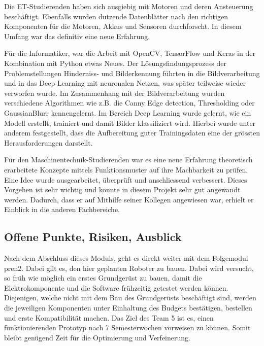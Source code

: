 Die ET-Studierenden haben sich ausgiebig mit Motoren und deren Ansteuerung beschäftigt. Ebenfalls wurden dutzende Datenblätter nach den richtigen Komponenten für die Motoren, Akkus und Sensoren durchforscht. In diesem Umfang war das definitiv eine neue Erfahrung.

Für die Informatiker, war die Arbeit mit OpenCV, TensorFlow und Keras in der Kombination mit Python etwas Neues. Der Lösungsfindungsprozess der Problemstellungen Hinderniss- und Bilderkennung führten in die Bildverarbeitung und in das Deep Learning mit neuronalen Netzen, was später teilweise wieder verworfen wurde.
Im Zusammenhang mit der Bildverarbeitung wurden verschiedene Algorithmen wie z.B. die Canny Edge detection, Thresholding oder GaussianBlurr kennengelernt. 
Im Bereich Deep Learning wurde gelernt, wie ein Modell erstellt, trainiert und damit Bilder klassifiziert wird. Hierbei wurde unter anderem festgestellt, dass die Aufbereitung guter Trainingsdaten eine der grössten Herausforderungen darstellt. 

Für den Maschinentechnik-Studierenden war es eine neue Erfahrung theoretisch erarbeitete Konzepte mittels Funktionsmuster auf ihre Machbarkeit zu prüfen. Eine Idee wurde ausgearbeitet, überprüft und anschliessend verbessert. Dieses Vorgehen ist sehr wichtig und konnte in diesem Projekt sehr gut angewandt werden.
Dadurch, dass er auf Mithilfe seiner Kollegen angewiesen war, erhielt er Einblick in die anderen Fachbereiche.






\subsection{Offene Punkte, Risiken, Ausblick}

Nach dem Abschluss dieses Moduls, geht es direkt weiter mit dem Folgemodul \acrshort{pren2}. Dabei gilt es, den hier geplanten Roboter zu bauen. Dabei wird versucht, so früh wie möglich ein erstes Grundgerüst zu bauen, damit die Elektrokomponente und die Software frühzeitig getestet werden können. Diejenigen, welche nicht mit dem Bau des Grundgerüsts beschäftigt sind, werden die jeweiligen Komponenten unter Einhaltung des Budgets bestätigen, bestellen und erste Kompatibilität machen.
Das Ziel des Team 5 ist es, einen funktionierenden Prototyp nach 7 Semesterwochen vorweisen zu können. Somit bleibt genügend Zeit für die Optimierung und Verfeinerung.

\newpage

